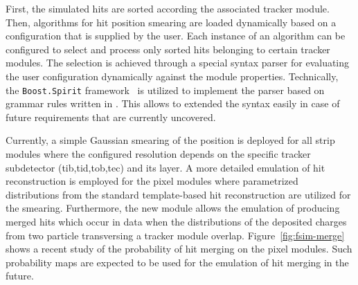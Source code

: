 
First, the simulated hits are sorted according the associated tracker module. Then, algorithms for hit position smearing are loaded dynamically based on a configuration that is supplied by the user. Each instance of an algorithm can be configured to select and process only sorted hits belonging to certain tracker modules. The selection is achieved through a special syntax parser for evaluating the user configuration dynamically against the module properties. Technically, the \texttt{Boost.Spirit} framework~\cite{boostspirit} is utilized to implement the parser based on grammar rules written in . This allows to extended the syntax easily in case of future requirements that are currently uncovered.

Currently, a simple Gaussian smearing of the position is deployed for all strip modules where the configured resolution depends on the specific tracker subdetector (\gls{tib},\gls{tid},\gls{tob},\gls{tec}) and its layer. A more detailed emulation of hit reconstruction is employed for the pixel modules where parametrized distributions from the standard template-based hit reconstruction are utilized for the smearing. Furthermore, the new module allows the emulation of producing merged hits which occur in data when the distributions of the deposited charges from two particle transversing a tracker module overlap. Figure~\ref{fig:fsim-merge} shows a recent study of the probability of hit merging on the pixel modules. Such probability maps are expected to be used for the emulation of hit merging in the future.






